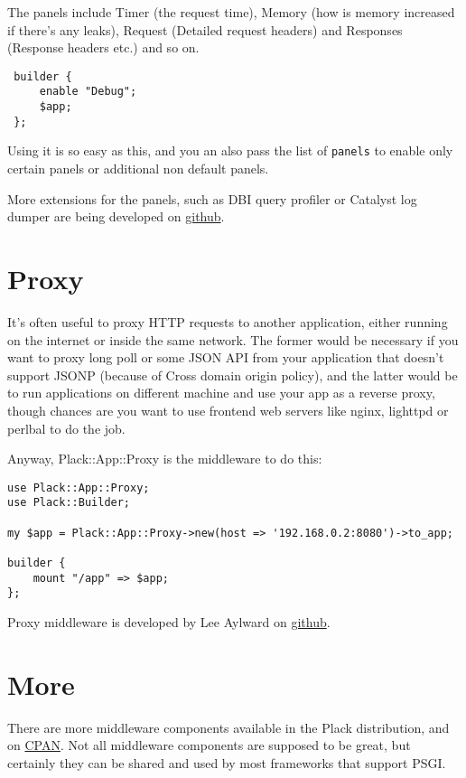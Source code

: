 The panels include Timer (the request time), Memory (how is memory
increased if there's any leaks), Request (Detailed request headers) and
Responses (Response headers etc.) and so on.

\begin{lstlisting}
 builder {
     enable "Debug";
     $app;
 };
\end{lstlisting}

Using it is so easy as this, and you an also pass the list of
\lstinline!panels! to enable only certain panels or additional non
default panels.

More extensions for the panels, such as DBI query profiler or Catalyst
log dumper are being developed on
\href{http://github.com/miyagawa/plack-middleware-debug/}{github}.

\section{Proxy}\label{proxy}

It's often useful to proxy HTTP requests to another application, either
running on the internet or inside the same network. The former would be
necessary if you want to proxy long poll or some JSON API from your
application that doesn't support JSONP (because of Cross domain origin
policy), and the latter would be to run applications on different
machine and use your app as a reverse proxy, though chances are you want
to use frontend web servers like nginx, lighttpd or perlbal to do the
job.

Anyway, Plack::App::Proxy is the middleware to do this:

\begin{lstlisting}
use Plack::App::Proxy;
use Plack::Builder;

my $app = Plack::App::Proxy->new(host => '192.168.0.2:8080')->to_app;

builder {
    mount "/app" => $app;
};
\end{lstlisting}

Proxy middleware is developed by Lee Aylward on
\href{http://github.com/leedo/Plack-App-Proxy}{github}.

\section{More}\label{more}

There are more middleware components available in the Plack
distribution, and on
\href{http://search.cpan.org/search?query=plack+middleware\&mode=dist}{CPAN}.
Not all middleware components are supposed to be great, but certainly
they can be shared and used by most frameworks that support PSGI.

